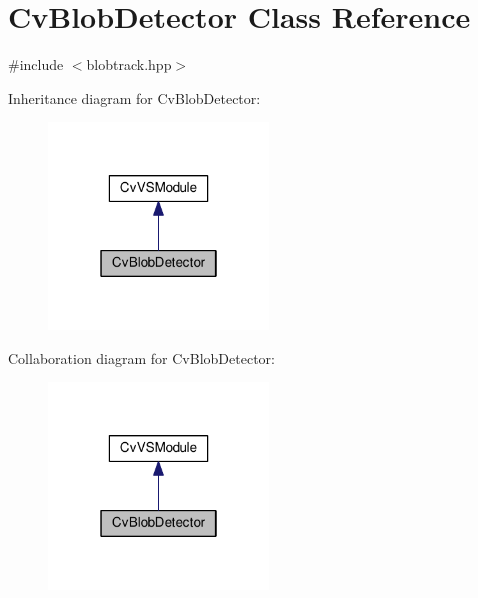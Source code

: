\hypertarget{classCvBlobDetector}{\section{Cv\-Blob\-Detector Class Reference}
\label{classCvBlobDetector}
}


{\ttfamily \#include $<$blobtrack.\-hpp$>$}



Inheritance diagram for Cv\-Blob\-Detector\-:\nopagebreak
\begin{figure}[H]
\begin{center}
\leavevmode
\includegraphics[width=166pt]{classCvBlobDetector__inherit__graph}
\end{center}
\end{figure}


Collaboration diagram for Cv\-Blob\-Detector\-:\nopagebreak
\begin{figure}[H]
\begin{center}
\leavevmode
\includegraphics[width=166pt]{classCvBlobDetector__coll__graph}
\end{center}
\end{figure}
